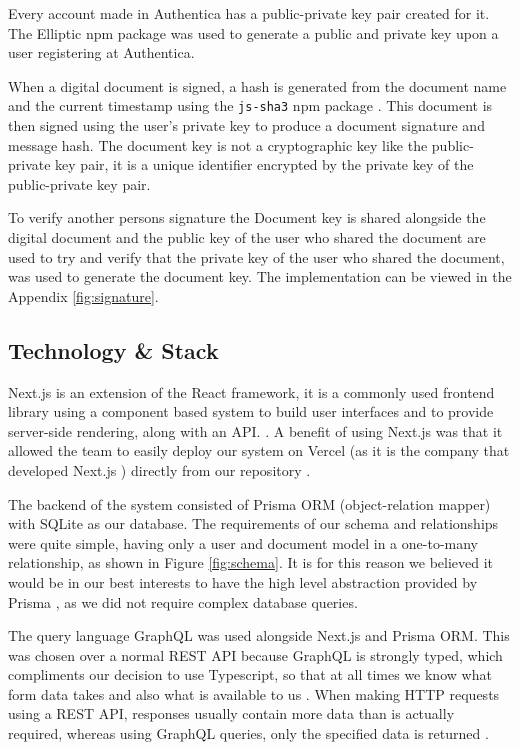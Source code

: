 \documentclass[a4,12pt]{article}
\begin{document}
Every account made in Authentica has a public-private key pair created for it. The Elliptic npm package \cite{elliptic} was used to generate a public and private key upon a user registering at Authentica.

When a  digital document is signed, a hash is generated from the document name and the current timestamp using the \texttt{js-sha3} npm package \cite{sha}. This document is then signed using the user's private key to produce a document signature and message hash. The document key is not a cryptographic key like the public-private key pair, it is a unique identifier encrypted by the private key of the public-private key pair.

To verify another persons signature the Document key is shared alongside the digital document and the public key of the user who shared the document are used to try and verify that the private key of the user who shared the document, was used to generate the document key. The implementation can be viewed in the Appendix \ref{fig:signature}.

\subsection*{Technology \& Stack}

Next.js is an extension of the React framework, it is a commonly used frontend library using a component based system to build user interfaces and to provide server-side rendering, along with an API. \cite{nextjsclock}. A benefit of using Next.js was that it allowed the team to easily deploy our system on Vercel \cite{authenticavercel} (as it is the company that developed Next.js \cite{vercel}) directly from our repository \cite{authenticarepo}.

The backend of the system consisted of Prisma ORM (object-relation mapper) with SQLite as our database. The requirements of our schema and relationships were quite simple, having only a user and document model in a one-to-many relationship, as shown in Figure \ref{fig:schema}. It is for this reason we believed it would be in our best interests to have the high level abstraction provided by Prisma \cite{prismaorm}, as we did not require complex database queries.

The query language GraphQL was used alongside Next.js and Prisma ORM. This was chosen over a normal REST API because GraphQL is strongly typed, which compliments our decision to use Typescript, so that at all times we know what form data takes and also what is available to us \cite{stablekernel}. When making HTTP requests using a REST API, responses usually contain more data than is actually required, whereas using GraphQL queries, only the specified data is returned \cite{javatpoint}.
\end{document}
